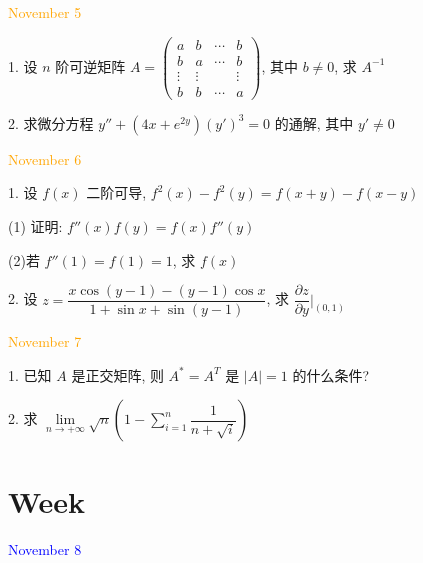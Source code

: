 \textcolor{orange}{November 5}

1. 设 $n$ 阶可逆矩阵 
$A=\begin{pmatrix}
	   a   &    b   & \cdots &    b   \\
	   b   &    a   & \cdots &    b   \\
	\vdots & \vdots &        & \vdots \\
	   b   &    b   & \cdots &    a
\end{pmatrix}$, 其中 $b\neq 0$, 求 $A^{-1}$
\begin{solution}
	
\end{solution}

2. 求微分方程 $y''+(4x+e^{2y})(y')^3=0$ 的通解, 其中 $y'\neq 0$
\begin{solution}
	
\end{solution}

\textcolor{orange}{November 6}

1. 设 $f(x)$ 二阶可导, $f^{2}(x)-f^{2}(y)=f(x+y)-f(x-y)$

(1) 证明: $f''(x)f(y)=f(x)f''(y)$

(2)若 $f''(1)=f(1)=1$, 求 $f(x)$
\begin{solution}
	
\end{solution}

2. 设 $\displaystyle{z=\dfrac{x\cos(y-1)-(y-1)\cos x}{1+\sin x+\sin(y-1)}}$, 求 $\dfrac{\partial z}{\partial y}|_{(0,1)}$
\begin{solution}
	
\end{solution}

\textcolor{orange}{November 7}

1. 已知 $A$ 是正交矩阵, 则 $A^{*}=A^{T}$ 是 $|A|=1$ 的什么条件?
\begin{solution}
	
\end{solution}

2. 求 $\displaystyle{\lim\limits_{n\to +\infty}\sqrt{n}\left( 1-\sum\limits_{i=1}^{n}\dfrac{1}{n+\sqrt{i}}\right)}$
\begin{solution}
	
\end{solution}

\section{Week }
\textcolor{blue}{November 8}

